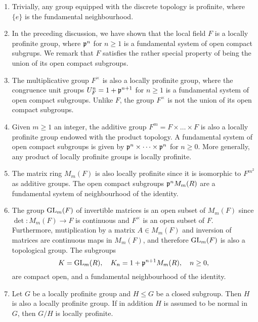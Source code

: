 \begin{examples} \label{example_prof_groups}

    \begin{enumerate}[(1)]
        \item Trivially, any group equipped with the discrete topology is profinite, where $\{e\}$ is the fundamental neighbourhood.
        \item In the preceding discussion, we have shown that the local field $F$ is a locally profinite group, where $\mathfrak{p}^n$ for $n\geq1$ is a fundamental system of open compact subgrups. We remark that $F$ satisfies the rather special property of being the union of its open compact subgroups. %
        \item The multiplicative group $F^{\times}$ is also a locally profinite group, where the congruence unit groups $U_F^n=1+\mathfrak{p}^{n+1}$ for $n\geq1$ is a fundamental system of open compact subgroups. Unlike $F$, the group $F^{\times}$ is not the union of its open compact subgroups.
        \item Given $m\geq1$ an integer, the additive group $F^m=F\times\dots\times F$ is also a locally profinite group endowed with the product topology. A fundamental system of open compact subgroups is given by $\mathfrak{p}^{n}\times\dots\times\mathfrak{p}^{n}$ for $n\geq0$. More generally, any product of locally profinite groups is locally profinite.
        \item The matrix ring $M_m(F)$ is also locally profinite since it is isomorphic to $F^{m^2}$ as additive groups. The open compact subgroups $\mathfrak{p}^n M_m(R)$ are a fundamental system of neighbourhood of the identity.
        \item The group $\mathrm{GL}_m(F)$ of invertible matrices is an open subset of $M_m(F)$ since $\det:M_m(F)\rightarrow F$ is continuous and $F^{\times}$ is an open subset of $F$. Furthermore, mutiplication by a matrix $A\in M_m(F)$ and inversion of matrices are continuous maps in $M_m(F)$, and therefore $\mathrm{GL}_m(F)$ is also a topological group. The subgroups
        $$K=\mathrm{GL}_m(R),\quad K_n=1+\mathfrak{p}^{n+1}M_m(R),\quad n\geq 0,$$
        are compact open, and a fundamental neighbourhood of the identity.
        \item Let $G$ be a locally profinite group and $H\leq G$ be a closed subgroup. Then $H$ is also a locally profinite group. If in addition $H$ is assumed to be normal in $G$, then $G/H$ is locally profinite. 
        
    \end{enumerate}
\end{examples}

